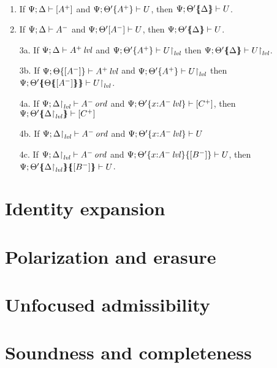 \bigskip
\bigskip
\bigskip

\begin{theorem}~
\begin{enumerate}
\item If ${\Psi};{\Delta} \vdash {[ A^+ ]}$
      and ${\Psi};{{\Theta'}\{{A^+}\}} \vdash {U}$, 
      then ${\Psi};{{\Theta'}\mbox{$\{\hspace{-4pt}\{$}{{\Delta}}\mbox{$\}\hspace{-4pt}\}$}} \vdash {U}$.
\item If ${\Psi};{\Delta} \vdash {A^-}$ 
      and ${\Psi};{\Theta'}[{A^-}] \vdash {U}$, 
      then ${\Psi};{{\Theta'}\mbox{$\{\hspace{-4pt}\{$}{\Delta}\mbox{$\}\hspace{-4pt}\}$}} \vdash {U}$.
\item[3a.] 
      If ${\Psi};{\Delta} \vdash {{A^+}\,{{\it lvl}}}$
      and ${\Psi};{{\Theta'}\{{A^+}\}} \vdash {\ensuremath{{U}{\upharpoonright}_{{\it lvl}}}}$
      then ${\Psi};{{\Theta'}\mbox{$\{\hspace{-4pt}\{$}{\Delta}\mbox{$\}\hspace{-4pt}\}$}} \vdash {\ensuremath{{U}{\upharpoonright}_{{\it lvl}}}}$.
\item[3b.] 
      If ${\Psi};{{\Theta}\{{[A^-]}\}} \vdash {{A^+}\,{{\it lvl}}}$
      and ${\Psi};{{\Theta'}\{{A^+}\}} \vdash {\ensuremath{{U}{\upharpoonright}_{{\it lvl}}}}$
      then ${\Psi};{{\Theta'}\mbox{$\{\hspace{-4pt}\{$}{{\Theta}\mbox{$\{\hspace{-4pt}\{$}{[A^-]}\mbox{$\}\hspace{-4pt}\}$}}\mbox{$\}\hspace{-4pt}\}$}} \vdash {\ensuremath{{U}{\upharpoonright}_{{\it lvl}}}}$.
\item[4a.]
      If ${\Psi};{{\Delta}{\upharpoonright}_{{\it lvl}}} \vdash {{A^-}\,{{\it ord}}}$
      and ${\Psi};{{\Theta'}\{{x{:}{A^-}\,{{\it lvl}}}\}} \vdash [{C^+}]$,
      then ${\Psi};{{\Theta'}\mbox{$\{\hspace{-4pt}\{$}{\ensuremath{{\Delta}{\upharpoonright}_{{\it lvl}}}}\mbox{$\}\hspace{-4pt}\}$}} \vdash [{C^+}]$
\item[4b.]
      If ${\Psi};{{\Delta}{\upharpoonright}_{{\it lvl}}} \vdash {{A^-}\,{{\it ord}}}$
      and ${\Psi};{{\Theta'}\{{x{:}{A^-}\,{{\it lvl}}}\}} \vdash {U}$
\item[4c.]
      If ${\Psi};{{\Delta}{\upharpoonright}_{{\it lvl}}} \vdash {{A^-}\,{{\it ord}}}$
      and ${\Psi};{{{\Theta'}\{{x{:}{A^-}\,{{\it lvl}}}\}}\{{[B^-]}\}} \vdash {U}$,
      then ${\Psi};{{{\Theta'}\mbox{$\{\hspace{-4pt}\{$}{\ensuremath{{\Delta}{\upharpoonright}_{{\it lvl}}}}\mbox{$\}\hspace{-4pt}\}$}}\mbox{$\{\hspace{-4pt}\{$}{[B^-]}\mbox{$\}\hspace{-4pt}\}$}} \vdash {U}$.
\end{enumerate}
\end{theorem}

\section{Identity expansion}

\section{Polarization and erasure}


\section{Unfocused admissibility}

\section{Soundness and completeness}


